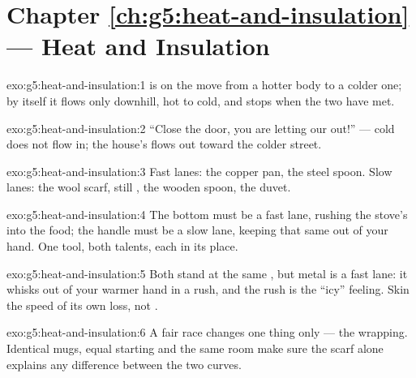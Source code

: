 \section*{Chapter \ref{ch:g5:heat-and-insulation} --- Heat and Insulation}

\begin{solution}{exo:g5:heat-and-insulation:1}
 is  on the move from a hotter body to a colder one; by
itself it flows only downhill, hot to cold, and stops when the two
 have met.
\end{solution}

\begin{solution}{exo:g5:heat-and-insulation:2}
``Close the door, you are letting our  out!'' --- cold does not
flow in; the house's  flows out toward the colder street.
\end{solution}

\begin{solution}{exo:g5:heat-and-insulation:3}
Fast lanes: the copper pan, the steel spoon. Slow lanes: the wool
scarf, still , the wooden spoon, the duvet.
\end{solution}

\begin{solution}{exo:g5:heat-and-insulation:4}
The bottom must be a fast lane, rushing the stove's  into the
food; the handle must be a slow lane, keeping that same  out
of your hand. One tool, both talents, each in its place.
\end{solution}

\begin{solution}{exo:g5:heat-and-insulation:5}
Both stand at the same , but metal is a fast lane: it
whisks  out of your warmer hand in a rush, and the rush is the
``icy'' feeling. Skin  the speed of its own  loss, not
.
\end{solution}

\begin{solution}{exo:g5:heat-and-insulation:6}
A fair race changes one thing only --- the wrapping. Identical
mugs, equal starting  and the same room make sure the scarf
alone explains any difference between the two curves.
\end{solution}

